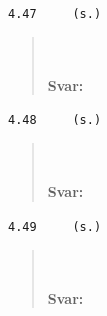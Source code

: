 \documentclass[a4paper]{article}
\newcommand{\tskcol}[1]{\textcolor{tskcol}{#1}}
\begin{document}
\texttt{\tskcol{4.47~~~~ (s.)}}
\begin{quotation}
	\noindent
	\\ \\
	\textbf{Svar:}
\end{quotation}

\texttt{\tskcol{4.48~~~~ (s.)}}
\begin{quotation}
	\noindent
	\\ \\
	\textbf{Svar:}
\end{quotation}

\texttt{\tskcol{4.49~~~~ (s.)}}
\begin{quotation}
	\noindent
	\\ \\
	\textbf{Svar:}
\end{quotation}
\end{document}
